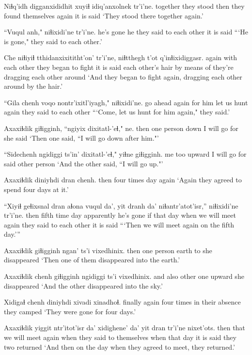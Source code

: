 \documentclass[12pt]{article}
\begin{document}
\gll Niɬq'idh digganxididhit xuyiɬ idiq'anxolnek  tr'i'ne.
together {they stood}  then {they found themselves again} {it is said}
\glt `They stood there together again.'
\glend

\gll ``Vuqul anh," niɬixidi'ne   tr'i'ne.
{he's gone}  he {they said to each other}  {it is said}
\glt ```He is gone," they said to each other.'
\glend

\gll Che niɬiyiɬ   tthidanxixititht'on' tr'i'ne, niɬtthegh  t'ot q'inɬixidiggasr.
again {with each other} {they began to fight} {it is said} {each other's hair} {by means of} {they're dragging each other around}
\glt `And they began to fight again, dragging each other around by the hair.'
\glend

\gll ``Gila chenh voqo  nontr'ixitl'iyagh," niɬixidi'ne.
{go ahead} again {for him} {let us hunt again} {they said to each other}
\glt ```Come, let us hunt for him again," they said.'
\glend

\gll Axaxiɬdik giɬigginh, ``ngiyix dixitatl-'eɬ," ne.
then  {one person} down  {I will go for} {she said}
\glt `Then one said, ``I will go down after him."'
\glend

\gll ``Sidechenh  {ngidiggi ts'in'} dixitatl-'eɬ," yiɬne giɬigginh.
{me too} upward {I will go for} said {other person}
\glt `And the other said, ``I will go up."'
\glend

\gll Axaxiɬdik diniyhdi dran chenh.
then  {four times} day  again
\glt `Again they agreed to spend four days at it.'
\glend

\gll ``Xiyiɬ geɬixsnal dran aɬona  vuqul  da', yit dranh da' niɬantr'atot'isr,'' niɬixidi'ne tr'i'ne.
then {fifth time} day apparently {he's gone} if that day  when {we will meet again} {they said to each other} {it is said}
\glt ```Then we will meet again on the fifth day.'''
\glend

\gll Axaxiɬdik giɬigginh ngan' ts'i vixedhinix.
then  {one person} earth to {she disappeared}
\glt `Then one of them disappeared into the earth.'
\glend

\gll Axaxiɬdik chenh giɬigginh {ngidiggi ts'i} vixedhinix.
and  also {other one} upward  {she disappeared}
\glt `And the other disappeared into the sky.'
\glend

\gll Xidigaɬ chenh diniyhdi xivadi   xinadhoɬ.
finally  again {four times} {in their absence} {they camped}
\glt `They were gone for four days.'
\glend

\gll Axaxiɬdik yiggit ntr'itot'isr  da' xidighene'  da'  yit dran tr'i'ne nixet'ots.
then  that {we will meet again} when {they said to themselves}  when  that day {it is said} {they two returned}
\glt `And then on the day when they agreed to meet, they returned.'
\glend
\end{document}
